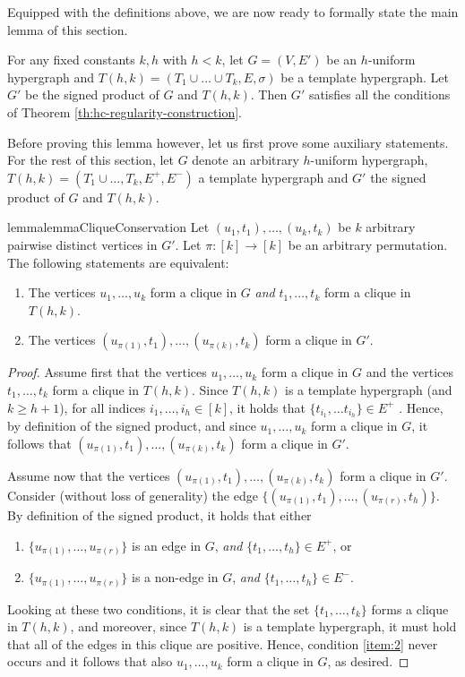 \documentclass[a4paper,UKenglish,cleveref, autoref, thm-restate,numberwithinsect]{lipics-v2021}
\begin{document}
\smallskip
Equipped with the definitions above, we are now ready to formally state the main lemma of this section.
\begin{lemma}\label{lemma:bichromatic-product}
    For any fixed constants $k,h$ with $h<k$, let $G = (V,E')$ be an $h$-uniform hypergraph and $T(h,k) = (T_1\cup \dots \cup T_k, E,\sigma)$ be a template hypergraph. Let $G'$ be the signed product of $G$ and $T(h,k)$. Then $G'$ satisfies all the conditions of Theorem \ref{th:hc-regularity-construction}.
\end{lemma}
Before proving this lemma however, let us first prove some auxiliary statements.
For the rest of this section, let $G$ denote an arbitrary $h$-uniform hypergraph, $T(h,k) = (T_1 \cup\dots,T_k,E^+,E^-)$ a template hypergraph and $G'$ the signed product of $G$ and $T(h,k)$.
\begin{restatable}{lemma}{lemmaCliqueConservation}\label{lemma:cliques-in-bichromatic-product}
    Let $(u_1,t_1), \dots, (u_k,t_k)$ be $k$ arbitrary pairwise distinct vertices in $G'$. Let $\pi:[k]\to [k]$ be an arbitrary permutation. The following statements are equivalent:
    \begin{enumerate}
      \item The vertices $u_{1}, \dots, u_k$ form a clique in $G$ \emph{and} $t_1, \dots, t_k$ form a clique in $T(h,k)$.
        \item The vertices $(u_{\pi(1)},t_1), \dots, (u_{\pi(k)},t_k)$ form a clique in $G'$.
    \end{enumerate}
\end{restatable}
\medskip
\begin{proof}
    Assume first that the vertices $u_1, \dots, u_k$ form a clique in $G$ and the vertices $t_1, \dots, t_k$ form a clique in $T(h,k)$.
    Since $T(h,k)$ is a template hypergraph (and $k\geq h+1$), for all indices $i_1,\dots, i_h\in [k]$, it holds that $\{t_{i_1}, \dots t_{i_h}\}\in E^+$ . 
    Hence, by definition of the signed product, and since $u_1,\dots, u_k$ form a clique in $G$, it follows that $(u_{\pi(1)},t_1), \dots, (u_{\pi(k)},t_k)$ form a clique in $G'$.

    Assume now that the vertices $(u_{\pi(1)},t_1), \dots, (u_{\pi(k)},t_k)$ form a clique in $G'$.
    Consider (without loss of generality) the edge $\{(u_{\pi(1)},t_1), \dots, (u_{\pi(r)},t_h)\}$. 
    By definition of the signed product, it holds that either 
    \begin{enumerate}
        \item $\{u_{\pi(1)}, \dots, u_{\pi(r)}\}$ is an edge in $G$, \emph{and} $\{t_1, \dots, t_h\}\in E^+$, or
        \item $\{u_{\pi(1)}, \dots, u_{\pi(r)}\}$ is a non-edge in $G$, \emph{and} $\{t_1, \dots, t_h\} \in E^-$.\label{item:2}
    \end{enumerate}
    Looking at these two conditions, it is clear that the set $\{t_1,\dots, t_k\}$ forms a clique in $T(h,k)$, and moreover, since $T(h,k)$ is a template hypergraph, it must hold that all of the edges in this clique are positive. 
    Hence, condition \ref{item:2} never occurs and it follows that also $u_1,\dots, u_k$ form a clique in $G$, as desired.
\end{proof}
\end{document}
